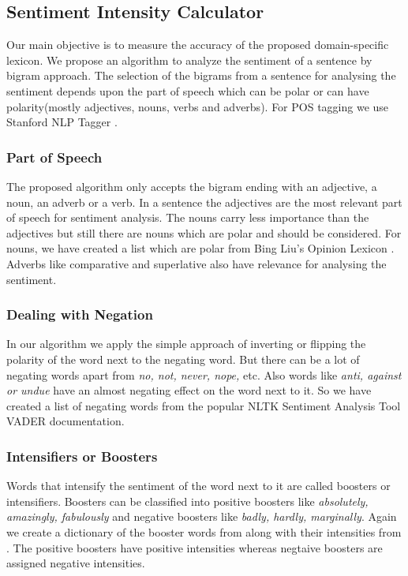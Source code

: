\documentclass[a4paper, 10pt, conference]{ieeeconf}      %
\begin{document}
\subsection{Sentiment Intensity Calculator}
Our main objective is to measure the accuracy of the proposed domain-specific lexicon. We propose an algorithm to analyze the sentiment of a sentence by bigram approach. The selection of the bigrams from a sentence for analysing the sentiment depends upon the part of speech which can be polar or can have polarity(mostly adjectives, nouns, verbs and adverbs). For POS tagging we use Stanford NLP Tagger \cite{c8}.
\subsubsection{Part of Speech}
The proposed algorithm only accepts the bigram ending with an adjective, a noun, an adverb or a verb.
In a sentence the adjectives are the most relevant part of speech for sentiment analysis. The nouns carry less importance than the adjectives but still there are nouns which are polar and should be considered. For nouns, we have created a list which are polar from Bing Liu's Opinion Lexicon \cite{c9,c10}. Adverbs like comparative and superlative also have relevance for analysing the sentiment. 
\subsubsection{Dealing with Negation}In our algorithm we apply the simple approach of inverting or flipping the polarity of the word next to the negating word. But there can be a lot of negating words apart from \textit{no, not, never, nope, }etc. Also words like \textit{anti, against or undue} have an almost negating effect on the word next to it. So we have created a list of negating words from the popular NLTK Sentiment Analysis Tool VADER \cite{c11} documentation.
\subsubsection{Intensifiers or Boosters}
Words that intensify the sentiment of the word next to it are called boosters or intensifiers. Boosters can be classified into positive boosters like \textit{absolutely, amazingly, fabulously} and negative boosters like \textit{badly, hardly, marginally}. Again we create a dictionary of the booster words from \cite{c11} along with their intensities from \cite{c1}. The positive boosters have positive intensities whereas negtaive boosters are assigned negative intensities.
\end{document}

